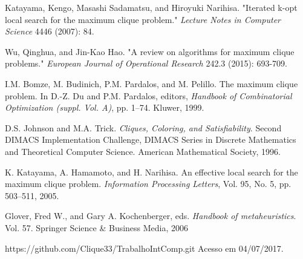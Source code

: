 \documentclass{article}
\begin{document}
\begin{thebibliography}{58}

  Katayama, Kengo, Masashi Sadamatsu, and Hiroyuki Narihisa. 
"Iterated k-opt local search for the maximum clique problem." 
\textit{Lecture Notes in Computer Science} 4446 (2007): 84.

Wu, Qinghua, and Jin-Kao Hao. 
"A review on algorithms for maximum clique problems." 
\textit{European Journal of Operational Research} 242.3 (2015): 693-709.

I.M. Bomze, M. Budinich, P.M. Pardalos, and M. Pelillo. The maximum clique
problem. In D.-Z. Du and P.M. Pardalos, editors, \textit{Handbook of Combinatorial
Optimization (suppl. Vol. A)}, pp. 1–74. Kluwer, 1999.

D.S. Johnson and M.A. Trick. \textit{Cliques, Coloring, and Satisfiability}. Second DIMACS
Implementation Challenge, DIMACS Series in Discrete Mathematics and
Theoretical Computer Science. American Mathematical Society, 1996.

 K. Katayama, A. Hamamoto, and H. Narihisa. An effective local search for the
maximum clique problem. \textit{Information Processing Letters}, Vol. 95, No. 5, pp.
503–511, 2005.

Glover, Fred W., and Gary A. Kochenberger, eds. \textit{Handbook of metaheuristics}. Vol. 57. Springer Science \& Business Media, 2006

https://github.com/Clique33/TrabalhoIntComp.git Acesso em 04/07/2017.

\end{thebibliography}
\end{document}
